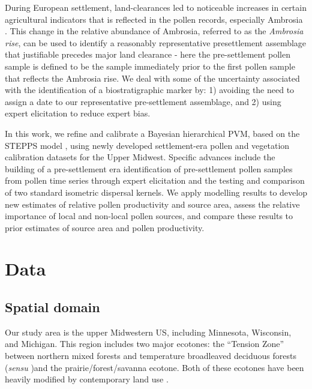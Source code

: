 \documentclass[12pt]{article}
\begin{document}
During European settlement, land-clearances led to noticeable
increases in certain agricultural indicators that is reflected in the
pollen records, especially Ambrosia \citep{mcandrews1988human}. This
change in the relative abundance of Ambrosia, referred to as the
\textit{Ambrosia rise}, can be used to identify a reasonably
representative presettlement assemblage that justifiable precedes
major land clearance - here the pre-settlement pollen sample is
defined to be the sample immediately prior to the first pollen sample
that reflects the Ambrosia rise. We deal with some of the uncertainty
associated with the identification of a biostratigraphic marker by: 1)
avoiding the need to assign a date to our representative
pre-settlement assemblage, and 2) using expert elicitation to reduce
expert bias.

In this work, we refine and calibrate a Bayesian hierarchical PVM,
based on the STEPPS model \citep{paciorek2009mapping}, using newly
developed settlement-era pollen and vegetation calibration datasets
for the Upper Midwest. Specific advances include the building of a
pre-settlement era identification of pre-settlement pollen samples
from pollen time series through expert elicitation and the testing and
comparison of two standard isometric dispersal kernels. We apply
modelling results to develop new estimates of relative pollen
productivity and source area, assess the relative importance of local
and non-local pollen sources, and compare these results to prior
estimates of source area and pollen productivity.

\section{Data}

\subsection{Spatial domain}

Our study area is the upper Midwestern US, including Minnesota,
Wisconsin, and Michigan.  This region includes two major ecotones: the
``Tension Zone'' between northern mixed forests and temperature
broadleaved deciduous forests (\textit{sensu}
\citet{curtis1959vegetation})and the prairie/forest/savanna ecotone.
Both of these ecotones have been heavily modified by contemporary land
use \citep{goring2015b}.
\end{document}
